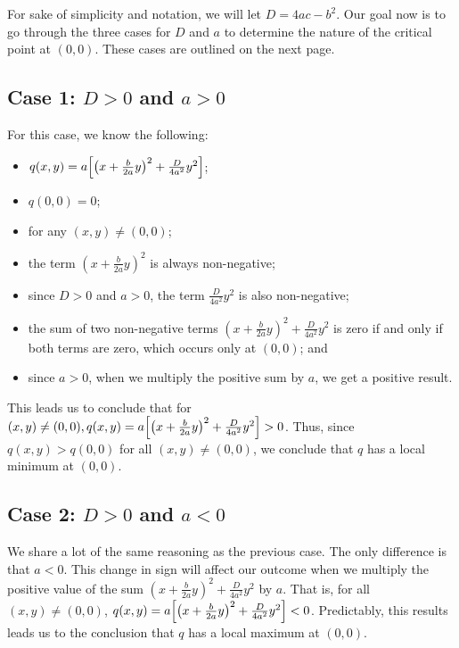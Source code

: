 \documentclass{article}
\begin{document}
For sake of simplicity and notation, we will let \( D = 4ac - b^{2} \). Our goal now is to go through the three cases for \( D \) and \( a \) to determine the nature of the critical point at \( (0, 0) \). These cases are outlined on the next page.

\subsection{Case 1: \( D > 0 \) and \( a > 0 \)}

For this case, we know the following: 
\begin{itemize}
	\item \( q(x,y) = a \Bigl[\bigl( x + \frac{b}{2a}y \bigr)^{2} + \frac{D}{4a^{2}}y^{2}\Bigr] \);
	\item \( q(0,0) = 0 \);
	\item for any \( (x,y) \neq (0,0) \);
	\item the term \( (x + \frac{b}{2a}y)^{2} \) is always non-negative;
	\item since \( D > 0 \) and \( a > 0 \), the term \( \frac{D}{4a^{2}}y^{2} \) is also non-negative;
	\item the sum of two non-negative terms \( (x + \frac{b}{2a}y)^{2} + \frac{D}{4a^{2}}y^{2} \) is zero if and only if both terms are zero, which occurs only at \( (0, 0) \); and
	\item since \( a > 0 \), when we multiply the positive sum by \( a \), we get a positive result.
\end{itemize}
This leads us to conclude that for \( (x,y) \ne (0,0), q(x,y) = a \Bigl[\bigl( x + \frac{b}{2a}y \bigr)^{2} + \frac{D}{4a^{2}}y^{2}\Bigr] > 0 \). Thus, since \( q(x,y) > q(0,0) \) for all \( (x,y) \ne (0,0) \), we conclude that \( q \) has a local minimum at \( (0, 0) \). 

\subsection{Case 2: \( D > 0 \) and \( a < 0 \)}

We share a lot of the same reasoning as the previous case. The only difference is that \( a < 0 \). This change in sign will affect our outcome when we multiply the positive value of the sum \( (x + \frac{b}{2a}y)^{2} + \frac{D}{4a^{2}}y^{2} \) by \( a \). That is, for all \( (x,y) \ne (0,0) \), \( q(x,y) = a\Bigl[\bigl( x + \frac{b}{2a}y \bigr)^{2} + \frac{D}{4a^{2}}y^{2}\Bigr] < 0 \). Predictably, this results leads us to the conclusion that \( q \) has a local maximum at \( (0, 0) \).
\end{document}
